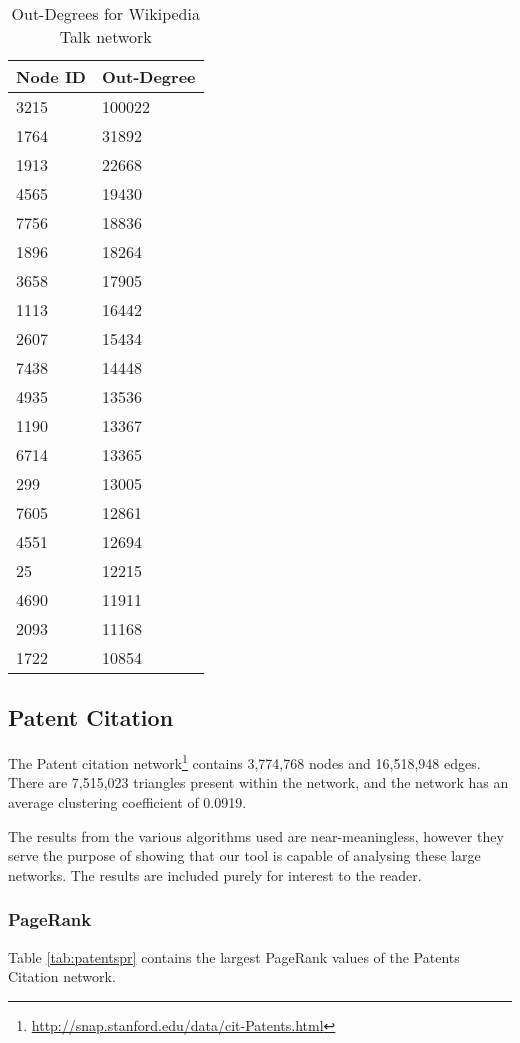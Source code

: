 \begin{table}%
\centering
\begin{tabular}{|l|l|}
\hline
Node ID & Out-Degree \\
\hline
3215 & 100022 \\
1764 & 31892 \\
1913 & 22668 \\
4565 & 19430 \\
7756 & 18836 \\
1896 & 18264 \\
3658 & 17905 \\
1113 & 16442 \\
2607 & 15434 \\
7438 & 14448 \\
4935 & 13536 \\
1190 & 13367 \\
6714 & 13365 \\
299 & 13005 \\
7605 & 12861 \\
4551 & 12694 \\
25 & 12215 \\
4690 & 11911 \\
2093 & 11168 \\
1722 & 10854 \\
\hline
\end{tabular}
\caption{Out-Degrees for Wikipedia Talk network}
\label{tab:wikitalkout}
\end{table}

\subsection{Patent Citation}
The Patent citation network\footnote{\url{http://snap.stanford.edu/data/cit-Patents.html}} contains 3,774,768 nodes and 16,518,948 edges. There are 7,515,023 triangles present within the network, and the network has an average clustering coefficient of 0.0919.

The results from the various algorithms used are near-meaningless, however they serve the purpose of showing that our tool is capable of analysing these large networks. The results are included purely for interest to the reader.

\subsubsection{PageRank}
Table \ref{tab:patentspr} contains the largest PageRank values of the Patents Citation network.

